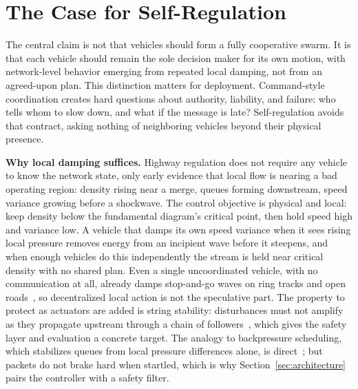 \section{The Case for Self-Regulation}
\label{sec:vision}

The central claim is not that vehicles should form a fully cooperative swarm. It is that each vehicle should remain the sole decision maker for its own motion, with network-level behavior emerging from repeated local damping, not from an agreed-upon plan. This distinction matters for deployment. Command-style coordination creates hard questions about authority, liability, and failure: who tells whom to slow down, and what if the message is late? Self-regulation avoids that contract, asking nothing of neighboring vehicles beyond their physical presence.

\noindent\textbf{Why local damping suffices.}
Highway regulation does not require any vehicle to know the network state, only early evidence that local flow is nearing a bad operating region: density rising near a merge, queues forming downstream, speed variance growing before a shockwave. The control objective is physical and local: keep density below the fundamental diagram's critical point, then hold speed high and variance low. A vehicle that damps its own speed variance when it sees rising local pressure removes energy from an incipient wave before it steepens, and when enough vehicles do this independently the stream is held near critical density with no shared plan. Even a single uncoordinated vehicle, with no communication at all, already damps stop-and-go waves on ring tracks and open roads~\cite{stern2018dissipation,lee2024traffic}, so decentralized local action is not the speculative part. The property to protect as actuators are added is string stability: disturbances must not amplify as they propagate upstream through a chain of followers~\cite{swaroop1996string}, which gives the safety layer and evaluation a concrete target. The analogy to backpressure scheduling, which stabilizes queues from local pressure differences alone, is direct~\cite{tassiulas1990stability}; but packets do not brake hard when startled, which is why Section~\ref{sec:architecture} pairs the controller with a safety filter.

